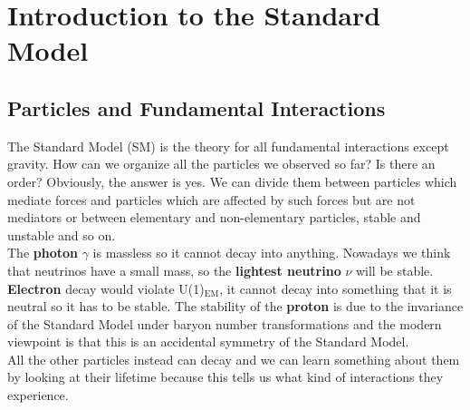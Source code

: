 \documentclass[../main.tex]{subfiles}
\begin{document}
\setchapterpreamble[u]{\margintoc}
\chapter[Introduction to the Standard Model]{Introduction to the Standard Model\footnotemark[0]}
\section{Particles and Fundamental Interactions}
The Standard Model (SM) is the theory for all fundamental interactions except gravity. How can we organize all the particles we observed so far? Is there an order? Obviously, the answer is yes. We can divide them between particles which mediate forces and particles which are affected by such forces but are not mediators or between elementary and non-elementary particles, stable and unstable and so on.\\
The \textbf{photon} $\gamma$ is massless so it cannot decay into anything. Nowadays we think that neutrinos have a small mass, so the \textbf{lightest neutrino} $\nu$ will be stable. \textbf{Electron} decay would violate U(1)$_{\text{EM}}$, it cannot decay into something that it is neutral so it has to be stable. The stability of the \textbf{proton} is due to the invariance of the Standard Model under baryon number transformations and the modern viewpoint is that this is an accidental symmetry of the Standard Model.\\
All the other particles instead can decay and we can learn something about them by looking at their lifetime because this tells us what kind of interactions they experience.
\end{document}
